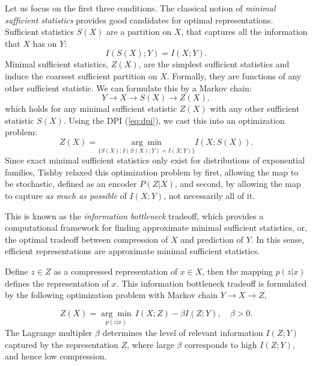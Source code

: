 \documentclass[11pt]{article}
\begin{document}
Let us focus on the first three conditions. The classical notion of \emph{minimal sufficient statistics} provides good candidates for optimal representations. Sufficient statistics $S(X)$ are a partition on $X$, that captures all the information that $X$ has on $Y$:
\begin{equation}
I(S(X); Y) = I(X;Y).
\end{equation}
Minimal sufficient statistics, $Z(X)$, are the simplest sufficient statistics and induce the coarsest sufficient partition on $X$. Formally, they are functions of any other sufficient statistic. We can formulate this by a Markov chain:
\begin{equation}
Y\rightarrow X\rightarrow S(X) \rightarrow Z(X),
\end{equation}
which holds for any minimal sufficient statistic $Z(X)$ with any other sufficient statistic $S(X)$. Using the DPI (\ref{eq:dpi}), we cast this into an optimization problem:
\begin{equation}
Z(X) = \underset{\{S(X):I(S(X);Y)=I(X;Y)\}}{\arg\min} I(X; S(X)).
\end{equation}
Since exact minimal sufficient statistics only exist for distributions of exponential families, Tishby relaxed this optimization problem by first, allowing the map to be stochastic, defined as an encoder $P(Z\vert X)$, and second, by allowing the map to capture \textit{as much as possible} of $I(X;Y)$, not necessarily all of it.

This is known as the \emph{information bottleneck} tradeoff, which provides a computational framework for finding approximate minimal sufficient statistics, or, the optimal tradeoff between compression of $X$ and prediction of $Y$. In this sense, efficient representations are approximate minimal sufficient statistics.

Define $z\in Z$ as a compressed representation of $x\in X$, then the mapping $p(z\vert x)$ defines the representation of $x$. This information bottleneck tradeoff is formulated by the following optimization problem with Markov chain $Y\rightarrow X \rightarrow Z$,

\begin{equation}
Z(X) = \underset{p(z \vert x)}{\arg\min}\, I(X; Z) -\beta I(Z;Y),\quad\beta>0.
\end{equation}
The Lagrange multipler $\beta$ determines the level of relevant information $I(Z;Y)$ captured by the representation $Z$, where large $\beta$ corresponds to high $I(Z;Y)$, and hence low compression.
\end{document}
